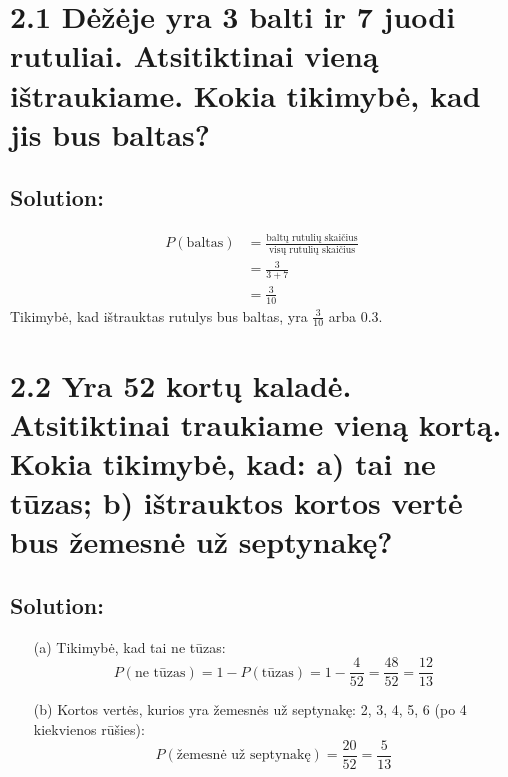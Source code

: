 \documentclass{article}
\begin{document}
\section*{2.1 Dėžėje yra 3 balti ir 7 juodi rutuliai. Atsitiktinai vieną ištraukiame. Kokia tikimybė, kad jis bus baltas?}

\subsection*{Solution:}
\begin{align*}
    P(\text{baltas}) &= \frac{\text{baltų rutulių skaičius}}{\text{visų rutulių skaičius}} \\
    &= \frac{3}{3 + 7} \\
    &= \frac{3}{10}
\end{align*}
Tikimybė, kad ištrauktas rutulys bus baltas, yra \( \frac{3}{10} \) arba 0.3.

\section*{2.2 Yra 52 kortų kaladė. Atsitiktinai traukiame vieną kortą. Kokia tikimybė, kad: a) tai ne tūzas; b) ištrauktos kortos vertė bus žemesnė už septynakę?}

\subsection*{Solution:}
\begin{itemize}
    \item[(a)] 
    Tikimybė, kad tai ne tūzas:
    \[
    P(\text{ne tūzas}) = 1 - P(\text{tūzas}) = 1 - \frac{4}{52} = \frac{48}{52} = \frac{12}{13}
    \]
    \item[(b)]
    Kortos vertės, kurios yra žemesnės už septynakę: 2, 3, 4, 5, 6 (po 4 kiekvienos rūšies):
    \[
    P(\text{žemesnė už septynakę}) = \frac{20}{52} = \frac{5}{13}
    \]
\end{itemize}
\end{document}
